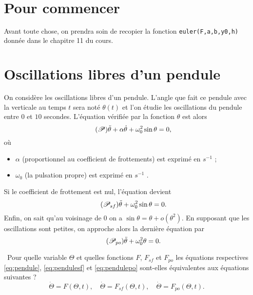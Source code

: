 \exer{[EQD-007]}
\setcounter{numques}{0}~\\

\section{Pour commencer}

Avant toute chose, on prendra soin de recopier la fonction \texttt{euler(F,a,b,y0,h)} donnée dans le chapitre 11 du cours. 

\section{Oscillations libres d'un pendule}

On considère les oscillations libres d'un pendule. L'angle que fait ce pendule avec la verticale au temps $t$ sera noté $\theta(t)$ et l'on étudie les oscillations du pendule entre $0$ et $10$ secondes.
L'équation vérifiée par la fonction $\theta$ est alors 
\begin{equation}\label{eq:pendule}\tag{$\mathscr{P}$}
  \ddot{\theta} + \alpha\dot{\theta}+\omega_0^2\sin\theta = 0,
\end{equation}
où
\begin{itemize}
  \item $\alpha$  (proportionnel au coefficient de frottements) est exprimé en $s^{-1}$ ;
  \item $\omega_0$ (la pulsation propre) est exprimé en $s^{-1}$ . 
\end{itemize}
Si le coefficient de frottement est nul, l'équation devient 
\begin{equation}\label{eq:pendulesf}\tag{$\mathscr{P}_{sf}$}
  \ddot{\theta} + \omega_0^2\sin\theta = 0.
\end{equation}
Enfin, on sait qu'au voisinage de $0$ on a $\sin\theta = \theta + o(\theta^2)$. En supposant que les oscillations sont petites, on approche alors la dernière équation par 
\begin{equation}\label{eq:pendulepo}\tag{$\mathscr{P}_{po}$}
  \ddot{\theta} + \omega_0^2\theta = 0.
\end{equation}

\question\ Pour quelle variable $\Theta$ et quelles fonctions $F$, $F_{sf}$ et $F_{po}$ les équations respectives \eqref{eq:pendule}, \eqref{eq:pendulesf} et \eqref{eq:pendulepo} sont-elles équivalentes aux équations suivantes ?
\begin{equation*}
  \dot{\Theta} = F(\Theta, t),\quad \dot{\Theta} = F_{sf}(\Theta, t), \quad \dot{\Theta} = F_{po}(\Theta, t).
\end{equation*}

